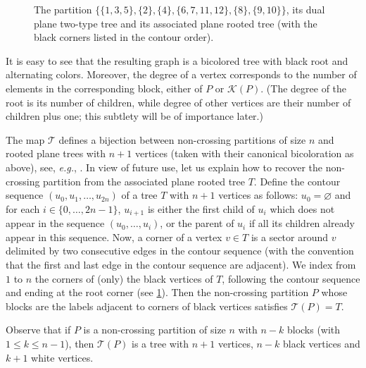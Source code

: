 \documentclass[AHL,XML,longabstracts,Unicode]{cedram}
\def\TTT{\mathcal T}
\begin{document}
\begin{figure}[t]
\begin{scriptsize}
\end{scriptsize}
\caption{The partition $\{\{1, 3, 5\}, \{2\}, \{4\}, \{6, 7, 11, 12\}, \{8\}, \{9, 10\}\}$, its dual plane two-type tree and its associated plane rooted tree (with the black corners listed in the contour order). }
\label{fig:nc}
\end{figure}

It is easy to see that the resulting graph is a bicolored tree with black root and alternating colors.
Moreover, the degree of a vertex corresponds to the number of elements in the corresponding block,
either of $P$ or $\mathcal K(P)$. (The degree of the root is its number of children, while degree
of other vertices are their number of children plus one; this subtlety will be of importance later.)


The map $\TTT$ defines a bijection between non-crossing partitions of size $n$
and rooted plane trees with $n+1$ vertices (taken with their canonical bicoloration as above), see, {\em e.g.}, \cite{KM17}.
In view of future use, let us  explain how to recover the non-crossing partition from the associated plane rooted tree $T$. Define the contour sequence $(u_0, u_1, \dots ,u_{2n})$ of a tree $T$  with $n+1$ vertices as follows: $u_0 = \varnothing$ and for each $i \in \{0, \dots, 2n-1\}$, $u_{i+1}$ is either the first child of $u_i$ which does not appear in the sequence $(u_0, \dots, u_i)$, or the parent of $u_i$ if all its children already appear in this sequence. Now, a corner of a vertex $v \in T$ is a sector around $v$ delimited by two consecutive edges in the contour sequence (with the convention that the first and last edge in the contour sequence are adjacent). We index from $1$ to $n$ the corners of (only) the black vertices of $T$, following the contour sequence and ending at the root corner (see \cref{fig:nc}). Then the non-crossing partition $P$ whose blocks are the labels adjacent to corners of black vertices satisfies $\mathcal{T}(P)=T$.

Observe that if $P$ is a non-crossing partition of size $n$ with $n-k$ blocks (with $1 \leq k \leq n-1$), then $ \mathcal{T}(P)$ is a tree with $n+1$ vertices,  $n-k$ black vertices and $k+1$ white vertices.
\end{document}
